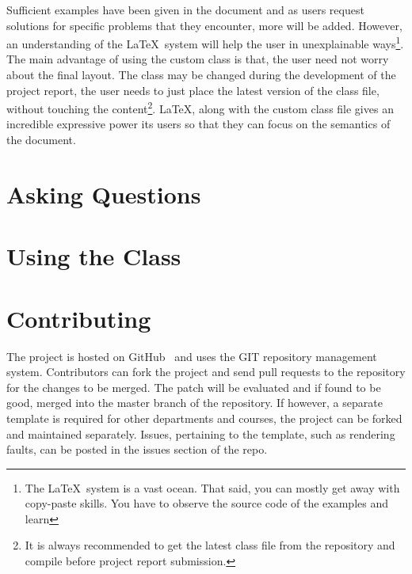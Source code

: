\documentclass{vitmsprojectreport}
\begin{document}
Sufficient examples have been given in the document and as users request solutions for specific problems that they encounter, more will be added. However, an understanding of the \LaTeX\ system will help the user in unexplainable ways\footnote{The \LaTeX\ system is a vast ocean. That said, you can mostly get away with copy-paste skills. You have to observe the source code of the examples and learn}. The main advantage of using the custom class is that, the user need not worry about the final layout. The class may be changed during the development of the project report, the user needs to just place the latest version of the class file, without touching the content\footnote{It is always recommended to get the latest class file from the repository and compile before project report submission.}. \LaTeX, along with the custom class file gives an incredible expressive power its users so that they can focus on the semantics of the document.

\section{Asking Questions}

\section{Using the Class}

\section{Contributing}

The project is hosted on GitHub~\cite{github2014} and uses the GIT repository management system. Contributors can fork the project and send pull requests to the repository for the changes to be merged. The patch will be evaluated and if found to be good, merged into the master branch of the repository. If however, a separate template is required for other departments and courses, the project can be forked and maintained separately. Issues, pertaining to the template, such as rendering faults, can be posted in the issues section of the repo.

\end{document}

